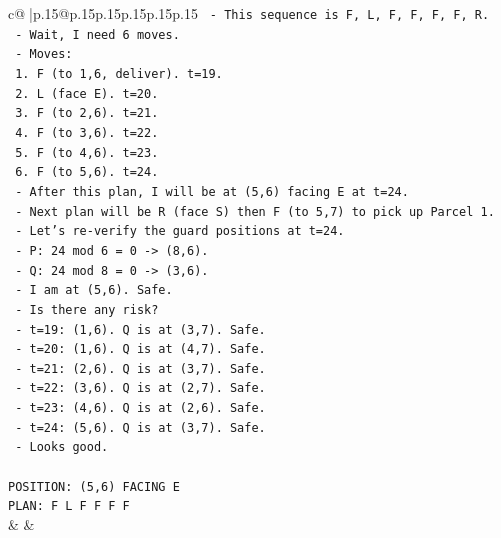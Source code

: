 \documentclass{article}
\begin{document}
{\begin{supertabular}{c@{$\;$}|p{.15\linewidth}@{}p{.15\linewidth}p{.15\linewidth}p{.15\linewidth}p{.15\linewidth}p{.15\linewidth}}
{{{\texttt{   {-} This sequence is F, L, F, F, F, F, R.} \\
\texttt{   {-} Wait, I need 6 moves.} \\
\texttt{   {-} Moves:} \\
\texttt{     1. F (to 1,6, deliver). t=19.} \\
\texttt{     2. L (face E). t=20.} \\
\texttt{     3. F (to 2,6). t=21.} \\
\texttt{     4. F (to 3,6). t=22.} \\
\texttt{     5. F (to 4,6). t=23.} \\
\texttt{     6. F (to 5,6). t=24.} \\
\texttt{   {-} After this plan, I will be at (5,6) facing E at t=24.} \\
\texttt{   {-} Next plan will be R (face S) then F (to 5,7) to pick up Parcel 1.} \\
\texttt{   {-} Let's re{-}verify the guard positions at t=24.} \\
\texttt{     {-} P: 24 mod 6 = 0 {-}> (8,6).} \\
\texttt{     {-} Q: 24 mod 8 = 0 {-}> (3,6).} \\
\texttt{     {-} I am at (5,6). Safe.} \\
\texttt{   {-} Is there any risk?} \\
\texttt{     {-} t=19: (1,6). Q is at (3,7). Safe.} \\
\texttt{     {-} t=20: (1,6). Q is at (4,7). Safe.} \\
\texttt{     {-} t=21: (2,6). Q is at (3,7). Safe.} \\
\texttt{     {-} t=22: (3,6). Q is at (2,7). Safe.} \\
\texttt{     {-} t=23: (4,6). Q is at (2,6). Safe.} \\
\texttt{     {-} t=24: (5,6). Q is at (3,7). Safe.} \\
\texttt{   {-} Looks good.} \\
\\ 
\texttt{POSITION: (5,6) FACING E} \\
\texttt{PLAN: F L F F F F} \\
            }
        }
    }
    & & \\ \\


\end{supertabular}}
\end{document}
